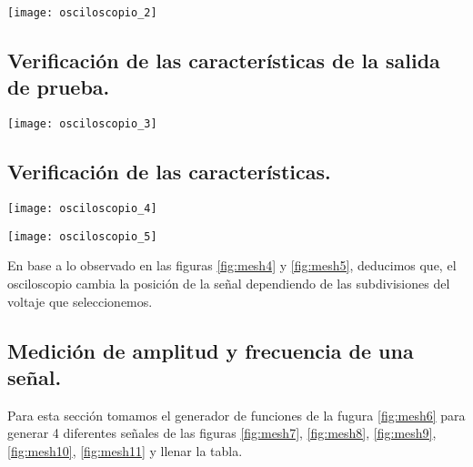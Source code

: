 \documentclass[11pt]{article}
\newenvironment{Figuras}
  {\par\medskip\noindent\minipage{\linewidth}}
  {\endminipage\par\medskip}
\begin{document}
\begin{multicols}{2}
			\begin{Figuras}
				\centering
			    \texttt{[image: osciloscopio\_2]}
			    \label{fig:mesh2}
			\end{Figuras}

		\subsection{Verificación de las características de la salida de prueba.}

			\begin{Figuras}
				\centering
			    \texttt{[image: osciloscopio\_3]}
			    \label{fig:mesh3}
			\end{Figuras}


		\subsection{Verificación de las características.}

			\begin{Figuras}
				\centering
			    \texttt{[image: osciloscopio\_4]}
			    \label{fig:mesh4}
			\end{Figuras}

			\begin{Figuras}
				\centering
			    \texttt{[image: osciloscopio\_5]}
			    \label{fig:mesh5}
			\end{Figuras}

			En base a lo observado en las figuras \ref{fig:mesh4} y \ref{fig:mesh5}, deducimos que, el osciloscopio cambia la posición de la señal dependiendo de las subdivisiones del voltaje que seleccionemos.

		\subsection{Medición de amplitud y frecuencia de una señal.}
		
			Para esta sección tomamos el generador de funciones de la fugura \ref{fig:mesh6} para generar 4 diferentes señales de las figuras \ref{fig:mesh7}, \ref{fig:mesh8}, \ref{fig:mesh9}, \ref{fig:mesh10},  \ref{fig:mesh11}  y llenar la tabla.


\end{multicols}
\end{document}
